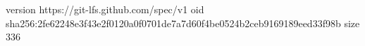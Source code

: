 version https://git-lfs.github.com/spec/v1
oid sha256:2fe62248e3f43e2f0120a0f0701de7a7d60f4be0524b2ceb9169189eed33f98b
size 336
